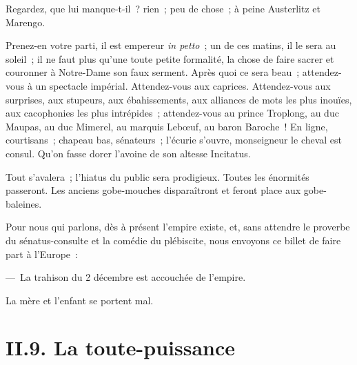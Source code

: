 \documentclass[french,twoside]{book} %
\begin{document}
Regardez, que lui manque-t-il ? rien ; peu de chose ; à peine Austerlitz et Marengo.\par
Prenez-en votre parti, il est empereur \emph{in petto} ; un de ces matins, il le sera au soleil ; il ne faut plus qu’une toute petite formalité, la chose de faire sacrer et couronner à Notre-Dame son faux serment. Après quoi ce sera beau ; attendez-vous à un spectacle impérial. Attendez-vous aux caprices. Attendez-vous aux surprises, aux stupeurs, aux ébahissements, aux alliances de mots les plus inouïes, aux cacophonies les plus intrépides ; attendez-vous au prince Troplong, au duc Maupas, au duc Mimerel, au marquis Lebœuf, au baron Baroche ! En ligne, courtisans ; chapeau bas, sénateurs ; l’écurie s’ouvre, monseigneur le cheval est consul. Qu’on fasse dorer l’avoine de son altesse Incitatus.\par
Tout s’avalera ; l’hiatus du public sera prodigieux. Toutes les énormités passeront. Les anciens gobe-mouches disparaîtront et feront place aux gobe-baleines.\par
Pour nous qui parlons, dès à présent l’empire existe, et, sans attendre le proverbe du sénatus-consulte et la comédie du plébiscite, nous envoyons ce billet de faire part à l’Europe :\par
— La trahison du 2 décembre est accouchée de l’empire.\par
La mère et l’enfant se portent mal.

\section[{II.9. La toute-puissance}]{II.9. La toute-puissance}
\end{document}
